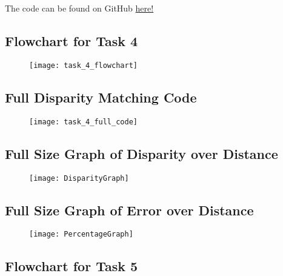 \documentclass[conference]{IEEEtran}
\begin{document}



The code can be found on GitHub \href{https://github.com/LukeDWaller99/Aint308}{here!} 

\onecolumn

\begin{appendix}
 
\subsection{Flowchart for Task 4} \label{appendix:task_4_flowchart}

\begin{figure}[H]
\centerline{\texttt{[image: task\_4\_flowchart]}}
\end{figure}

\subsection{Full Disparity Matching Code} \label{appendix:task_4_disparity_code}

\begin{figure}[H]
\centerline{\texttt{[image: task\_4\_full\_code]}}
\end{figure}

\subsection{Full Size Graph of Disparity over Distance} \label{appendix:DisparityGraph}

\begin{figure}[H]
\centerline{\texttt{[image: DisparityGraph]}}
\end{figure}

\subsection{Full Size Graph of Error over Distance} \label{appendix:PercentageGraph}

\begin{figure}[H]
\centerline{\texttt{[image: PercentageGraph]}}
\end{figure}

\subsection{Flowchart for Task 5} \label{appendix:task_5_flowchart}


\end{appendix}
\end{document}
